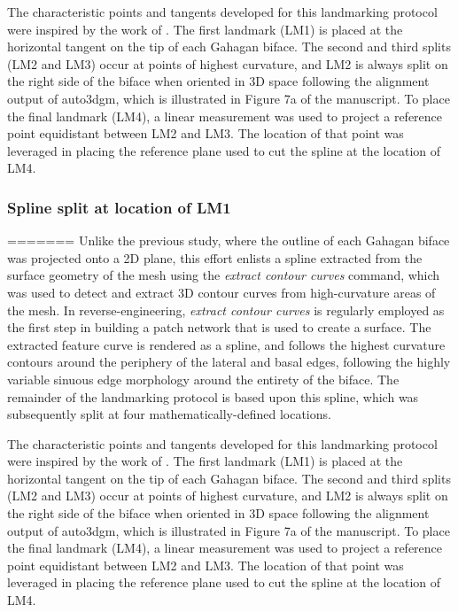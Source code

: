 \documentclass[review]{elsarticle}
\begin{document}
The characteristic points and tangents developed for this landmarking protocol were inspired by the work of \citet{RN11786}. The first landmark (LM1) is placed at the horizontal tangent on the tip of each Gahagan biface. The second and third splits (LM2 and LM3) occur at points of highest curvature, and LM2 is always split on the right side of the biface when oriented in 3D space following the alignment output of auto3dgm, which is illustrated in Figure 7a of the manuscript. To place the final landmark (LM4), a linear measurement was used to project a reference point equidistant between LM2 and LM3. The location of that point was leveraged in placing the reference plane used to cut the spline at the location of LM4.

\subsubsection*{Spline split at location of LM1}
=======
Unlike the previous study, where the outline of each Gahagan biface was projected onto a 2D plane, this effort enlists a spline extracted from the surface geometry of the mesh using the \textit{extract contour curves} command, which was used to detect and extract 3D contour curves from high-curvature areas of the mesh. In reverse-engineering, \textit{extract contour curves} is regularly employed as the first step in building a patch network that is used to create a surface. The extracted feature curve is rendered as a spline, and follows the highest curvature contours around the periphery of the lateral and basal edges, following the highly variable sinuous edge morphology around the entirety of the biface. The remainder of the landmarking protocol is based upon this spline, which was subsequently split at four mathematically-defined locations.

The characteristic points and tangents developed for this landmarking protocol were inspired by the work of \citet{RN11786}. The first landmark (LM1) is placed at the horizontal tangent on the tip of each Gahagan biface. The second and third splits (LM2 and LM3) occur at points of highest curvature, and LM2 is always split on the right side of the biface when oriented in 3D space following the alignment output of auto3dgm, which is illustrated in Figure 7a of the manuscript. To place the final landmark (LM4), a linear measurement was used to project a reference point equidistant between LM2 and LM3. The location of that point was leveraged in placing the reference plane used to cut the spline at the location of LM4.
\end{document}
